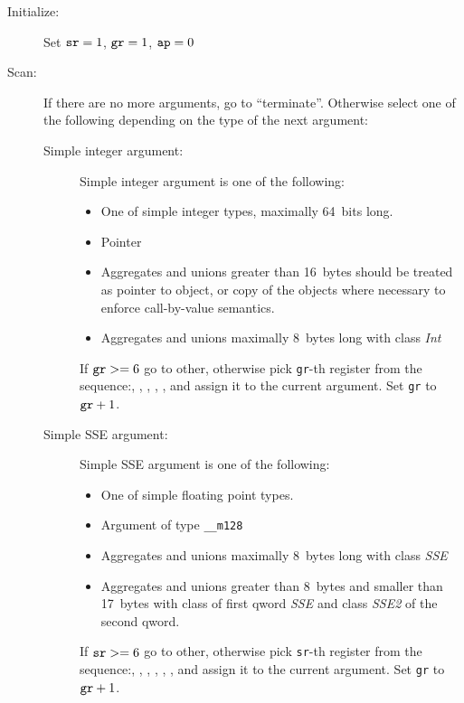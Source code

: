 \begin{description}
  \item[Initialize:]
    Set $\verb|sr|=1$, $\verb|gr|=1$, $\verb|ap|=0$


  \item[Scan:]
    If there are no more arguments, go to ``terminate''. Otherwise select one of the
    following depending on the type of the next argument:
      \begin{description}
        \item[Simple integer argument:]
          Simple integer argument is one of the following:
          \begin{itemize}
            \item One of simple integer types, maximally 64~bits long.
            \item Pointer
            \item Aggregates and unions greater than 16~bytes should be treated as
              pointer to object, or copy of the objects where necessary to enforce
              call-by-value semantics.
            \item Aggregates and unions maximally 8~bytes long with class \emph{Int}
          \end{itemize}
        If $\verb|gr| >= 6$ go to other, otherwise pick \verb|gr|-th register from
        the sequence:\RAX, \RDX, \RCX, \RBX, \RSI, \RDI{} and assign it to the current
        argument. Set \verb|gr| to $\verb|gr|+1$.


    \item[Simple SSE argument:]
      Simple SSE argument is one of the following:
      \begin{itemize}
        \item One of simple floating point types.
        \item Argument of type \verb|__m128|
        \item Aggregates and unions maximally 8~bytes long with class \emph{SSE}
        \item Aggregates and unions greater than 8~bytes and smaller than 17~bytes with class of first qword \emph{SSE}
          and class \emph{SSE2} of the second qword.
      \end{itemize}
      If $\verb|sr| >= 6$ go to other, otherwise pick \verb|sr|-th register from
      the sequence:, , , , , , 
      and assign it to the current argument.
      Set \verb|gr| to $\verb|gr|+1$.


\end{description}
\end{description}
